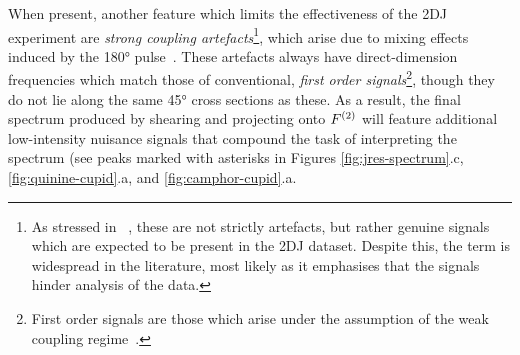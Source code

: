 When present, another feature which limits the effectiveness of the \ac{2DJ}
experiment are \emph{strong coupling artefacts}\footnote{
    As stressed in ~\cite{Thrippleton2005}, these are not strictly artefacts,
    but rather genuine signals which are expected to be present in the
    \ac{2DJ} dataset. Despite this, the term is widespread in the literature,
    most likely as it emphasises that the signals hinder analysis of the data.
}, which arise due to mixing effects induced by the \ang{180}
pulse~\cite{Wider1983,Thrippleton2005}.
These artefacts always have direct-dimension
frequencies which match those of conventional, \emph{first order signals}\footnote{
    First order signals are those which arise under the assumption of the weak
    coupling regime~\cite[Section 2.5.2]{Cavanagh2007}.
}, though they do not lie along the same \ang{45} cross sections as
these. As a result, the final spectrum produced by shearing and projecting onto
$F^{(2)}$ will feature additional low-intensity nuisance signals that
compound the task of interpreting the spectrum (see peaks marked with asterisks
in Figures \ref{fig:jres-spectrum}.c, \ref{fig:quinine-cupid}.a, and
\ref{fig:camphor-cupid}.a.


